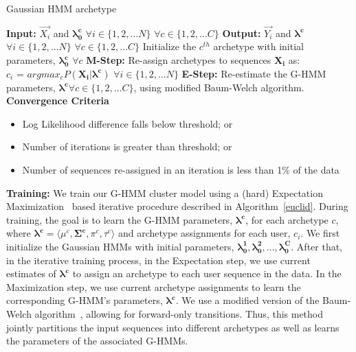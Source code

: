 \begin{algorithm}[tbh]
 \caption{Gaussian HMM archetype}\label{euclid}
 \begin{algorithmic}[1]
 \State \textbf{Input:} $\vec{X_i}$ and $\mathbf{\lambda^c_0}$ $\forall i \in \{1, 2, \ldots N\}$ $\forall c \in \{1, 2, \ldots C\}$\;
 \State \textbf{Output:} $\vec{Y_i}$ and $\mathbf{\lambda^c}$ $\forall i \in \{1, 2, \ldots N\}$ $\forall c \in \{1, 2, \ldots C\}$\;
 \State Initialize the $c^{th}$ archetype with initial parameters, $\mathbf{\lambda^c_0}$ $\forall c$\;
  \State \textbf{M-Step:} Re-assign archetypes to sequences $\mathbf{X_i}$ as: \\
  $c_i$ =  $argmax_{c} P(\mathbf{X_i} | \mathbf{\lambda^c})$ $\forall i \in \{1, 2, \ldots N\}$\;
  \State \textbf{E-Step:} Re-estimate the G-HMM parameters, $\mathbf{\lambda^c} \forall c \in \{1, 2, \ldots C\}$, using modified Baum-Welch algorithm.\;
\EndWhile
 \State \textbf {Convergence Criteria}\;
 \begin{itemize}
   \itemsep0em
  \item Log Likelihood difference falls below threshold; or\
  \item Number of iterations is greater than threshold; or\
  \item Number of sequences re-assigned in an iteration is less than 1\% of the data\
 \end{itemize}
 \end{algorithmic}
\end{algorithm}

\textbf{Training:} We train our G-HMM cluster model using a (hard) Expectation Maximization~\citep{Dempster:1977} based iterative procedure described in Algorithm~\ref{euclid}. During training, the goal is to learn the G-HMM parameters, $ \mathbf{\lambda^c}$, for each archetype $c$, where $\mathbf{\lambda^c} = \langle\mu^c, \mathbf{\Sigma^c}, \pi^c, \tau^c \rangle$ and archetype assignments for each user, $c_i$. We first initialize the Gaussian HMMs with initial parameters, $ \mathbf{\lambda_0^1}, \mathbf{\lambda_0^2}, \ldots, \mathbf{\lambda_0^C}$. After that, in the iterative training process, in the Expectation step, we use current estimates of $\mathbf{\lambda^c}$ to assign an archetype to each user sequence in the data. In the Maximization step, we use current archetype assignments to learn the corresponding G-HMM's parameters, $\mathbf{\lambda^c}$. We use a modified version of the Baum-Welch algorithm~\citep{Rabiner:1990}, allowing for forward-only transitions. Thus, this method jointly partitions the input sequences into different archetypes as well as learns the parameters of the associated G-HMMs.

